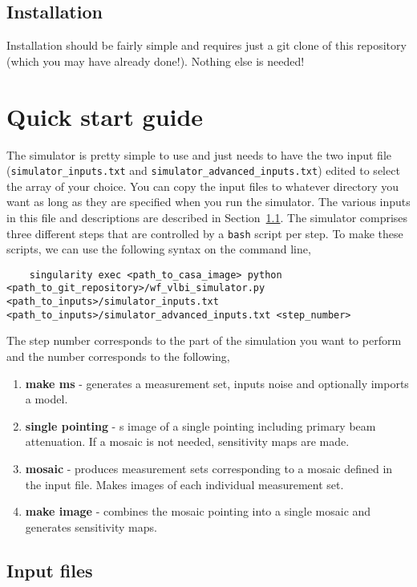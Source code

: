 \documentclass[11pt]{report_jfr}
\begin{document}
\subsection{Installation}

Installation should be fairly simple and requires just a git clone of this repository (which you may have already done!). Nothing else is needed!

\section{Quick start guide}

The simulator is pretty simple to use and just needs to have the two input file (\texttt{simulator\_inputs.txt} and \texttt{simulator\_advanced\_inputs.txt}) edited to select the array of your choice. You can copy the input files to whatever directory you want as long as they are specified when you run the simulator. The various inputs in this file and descriptions are described in Section~\ref{ss:inputfile}. The simulator comprises three different steps that are controlled by a \texttt{bash} script per step. To make these scripts, we can use the following syntax on the command line,
%
\begin{lstlisting}
	singularity exec <path_to_casa_image> python <path_to_git_repository>/wf_vlbi_simulator.py <path_to_inputs>/simulator_inputs.txt <path_to_inputs>/simulator_advanced_inputs.txt <step_number>
\end{lstlisting}
%
The step number corresponds to the part of the simulation you want to perform and the number corresponds to the following,
%
\begin{enumerate}
	\item \textbf{make ms} - generates a measurement set, inputs noise and optionally imports a model.
	\item \textbf{single pointing} - s image of a single pointing including primary beam attenuation. If a mosaic is not needed, sensitivity maps are made.
	\item \textbf{mosaic} - produces measurement sets corresponding to a mosaic defined in the input file. Makes images of each individual measurement set.
	\item \textbf{make image} - combines the mosaic pointing into a single mosaic and generates sensitivity maps.
\end{enumerate}

\subsection{Input files}\label{ss:inputfile}
\end{document}
